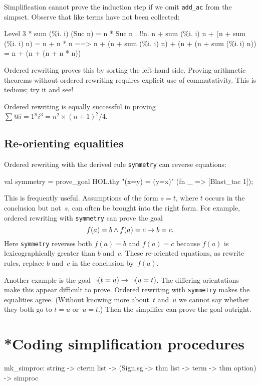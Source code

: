 Simplification cannot prove the induction step if we omit \texttt{add_ac} from
the simpset.  Observe that like terms have not been collected:
\begin{ttbox}
{\out Level 3}
{ * sum (\%i. i) (Suc n) = n * Suc n}
{. !!n. n + sum (\%i. i) n + (n + sum (\%i. i) n) = n + n * n}
{\out           ==> n + (n + sum (\%i. i) n) + (n + (n + sum (\%i.\,i) n)) =}
{\out               n + (n + (n + n * n))}
\end{ttbox}
Ordered rewriting proves this by sorting the left-hand side.  Proving
arithmetic theorems without ordered rewriting requires explicit use of
commutativity.  This is tedious; try it and see!

Ordered rewriting is equally successful in proving
$\sum@{i=1}^n i^3 = n^2\times(n+1)^2/4$.


\subsection{Re-orienting equalities}
Ordered rewriting with the derived rule \texttt{symmetry} can reverse
equations:
\begin{ttbox}
val symmetry = prove_goal HOL.thy "(x=y) = (y=x)"
                 (fn _ => [Blast_tac 1]);
\end{ttbox}
This is frequently useful.  Assumptions of the form $s=t$, where $t$ occurs
in the conclusion but not~$s$, can often be brought into the right form.
For example, ordered rewriting with \texttt{symmetry} can prove the goal
\[ f(a)=b \wedge f(a)=c \rightarrow b=c. \]
Here \texttt{symmetry} reverses both $f(a)=b$ and $f(a)=c$
because $f(a)$ is lexicographically greater than $b$ and~$c$.  These
re-oriented equations, as rewrite rules, replace $b$ and~$c$ in the
conclusion by~$f(a)$. 

Another example is the goal $\lnot(t=u) \rightarrow \lnot(u=t)$.
The differing orientations make this appear difficult to prove.  Ordered
rewriting with \texttt{symmetry} makes the equalities agree.  (Without
knowing more about~$t$ and~$u$ we cannot say whether they both go to $t=u$
or~$u=t$.)  Then the simplifier can prove the goal outright.



\section{*Coding simplification procedures}
\begin{ttbox}
mk_simproc: string -> cterm list ->
              (Sign.sg -> thm list -> term -> thm option) -> simproc
\end{ttbox}

